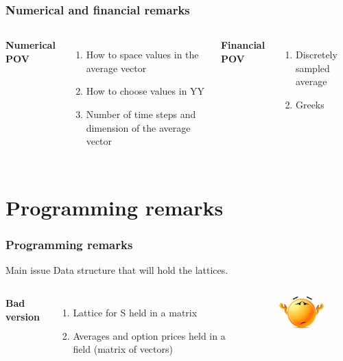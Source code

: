 \documentclass{beamer}
\begin{document}
\begin{frame}
\frametitle{Numerical and financial remarks}
\begin{columns}[t] %

\textbf{Numerical POV}
\begin{enumerate}
\item How to space values in the average vector
\item How to choose values in YY
\item Number of time steps and dimension of the average vector
\end{enumerate}

\textbf{Financial POV}
\begin{enumerate}
\item Discretely sampled average
\item Greeks
\end{enumerate}

\end{columns}
\end{frame}
\section{Programming remarks}

\begin{frame}
\frametitle{Programming remarks}

\begin{block}{Main issue}
Data structure that will hold the lattices.
\end{block}
\vspace{10mm}
\begin{columns}[c] %

\textbf{Bad version}
\begin{enumerate}
\item Lattice for S held in a matrix
\item Averages and option prices held in a field (matrix of vectors)
\end{enumerate}

\begin{figure}
	\includegraphics[scale=0.8]{no}
\end{figure}

\end{columns}
\end{frame}
\end{document}
